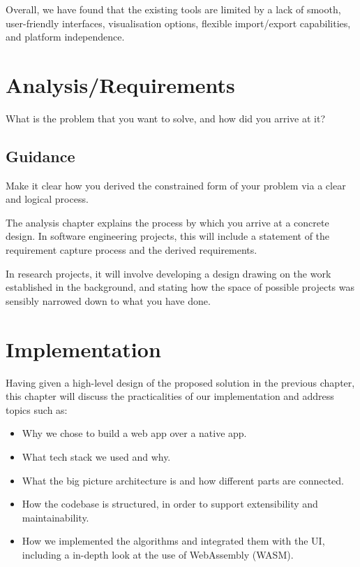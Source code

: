 \documentclass{l4proj}
\begin{document}
Overall, we have found that the existing tools are limited by a lack of smooth, user-friendly interfaces, visualisation options, flexible import/export capabilities, and platform independence.

\chapter{Analysis/Requirements}
What is the problem that you want to solve, and how did you arrive at it?
\section{Guidance}
Make it clear how you derived the constrained form of your problem via a clear and logical process.

The analysis chapter explains the process by which you arrive at a concrete design. In software
engineering projects, this will include a statement of the requirement capture process and the
derived requirements.

In research projects, it will involve developing a design drawing on
the work established in the background, and stating how the space of possible projects was
sensibly narrowed down to what you have done.

\chapter{Implementation}
Having given a high-level design of the proposed solution in the previous chapter, this chapter will discuss the practicalities of our implementation and address topics such as:
\begin{itemize}
    \item Why we chose to build a web app over a native app.
    \item What tech stack we used and why.
    \item What the big picture architecture is and how different parts are connected.
    \item How the codebase is structured, in order to support extensibility and maintainability.
    \item How we implemented the algorithms and integrated them with the UI, including a in-depth look at the use of WebAssembly (WASM).
\end{itemize}
\end{document}
